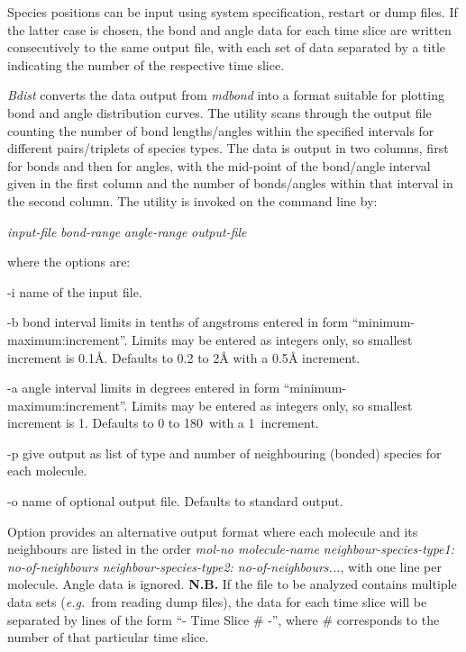 \documentclass[a4paper,twoside]{report}
\newcommand{\eg}{\emph{e.g.}}
\begin{document}
Species positions can be input using system specification, restart or dump
files. If the latter case is chosen, the bond and angle data for each time
slice are written consecutively to the same output file, with each set of
data separated by a title indicating the number of the respective time
slice.

\emph{Bdist} converts the data output from \emph{mdbond} into a format
suitable for
plotting bond and angle distribution curves. The utility scans through the
output file counting the number of bond lengths/angles within the
specified intervals for different pairs/triplets of species types. The
data is output in two columns, first for bonds and then for angles, with
the mid-point of the bond/angle interval given in the first column and the
number of bonds/angles within that interval in the second column. The
utility is invoked on the command line by:

\begin{center}
\Lit{[-i} \textit{input-file}\Lit{]}
\Lit{[-b} \textit{bond-range}\Lit{]}
\Lit{[-a} \textit{angle-range}\Lit{]}
\Lit{[-p]}
\Lit{[-o} \textit{output-file}\Lit{]}
\end{center}

where the options are:
\begin{Argdescription}
\item[-i] name of the input file.
\item[-b] bond interval limits in tenths of angstroms entered in form
  ``minimum-maximum:increment''. Limits may be entered as integers
  only, so smallest increment is 0.1{\AA}. Defaults to 0.2 to 2{\AA} with
  a 0.5{\AA} increment.
\item[-a] angle interval limits in degrees entered in form
  ``minimum-maximum:increment''. Limits may be entered as integers only,
  so smallest increment is 1{\textdegree}. Defaults to 0 to
  180{\textdegree}\ with a 1{\textdegree}\ increment.
\item[-p] give output as list of type and number
of neighbouring (bonded) species for each molecule.
\item[-o] name of optional output file. Defaults to standard output.
\end{Argdescription}

Option  provides an alternative output format where each molecule and its neighbours
are listed in the order \textit{mol-no molecule-name neighbour-species-type1: no-of-neighbours
 neighbour-species-type2: no-of-neighbours...}, with one line per molecule. Angle data is ignored.
\textbf{N.B.} If the file to be analyzed contains
multiple data sets (\eg\ from reading dump files), the data for each time slice
will be separated by lines of the form ``- Time Slice \# -'', where \# corresponds to the
number of that particular time slice.
\end{document}
